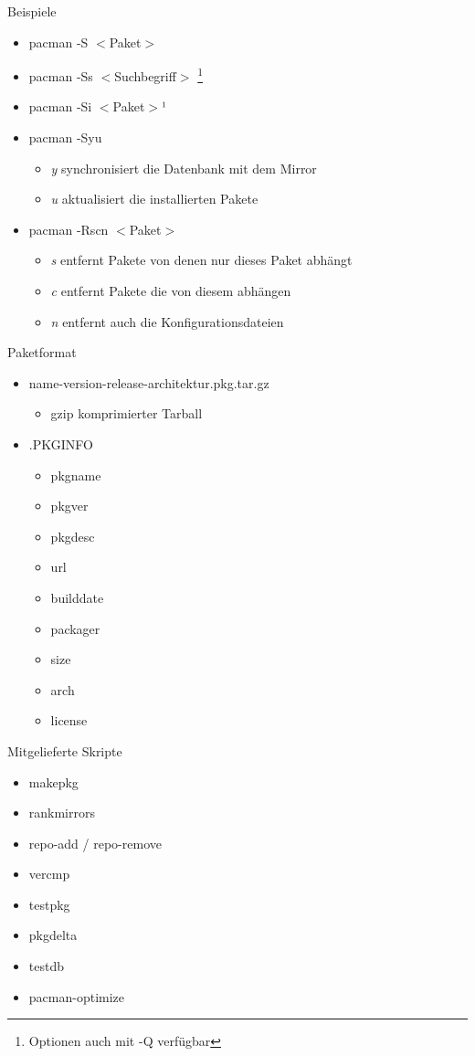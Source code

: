 \begin{slide}{Beispiele}
	\begin{itemize}
		\item{pacman -S $<$Paket$>$}
		\item{pacman -Ss $<$Suchbegriff$>$
			\footnote{Optionen auch mit -Q verf\"{u}gbar}
		}
		\item{pacman -Si $<$Paket$>$¹}
		\item{pacman -Syu
			\begin{itemize}
				\item{\textit{y} synchronisiert die Datenbank mit dem Mirror}
				\item{\textit{u} aktualisiert die installierten Pakete}
			\end{itemize}
		}
		\item{pacman -Rscn $<$Paket$>$
			\begin{itemize}
				\item{\textit{s} entfernt Pakete von denen nur dieses Paket
					abh\"{a}ngt}
				\item{\textit{c} entfernt Pakete die von diesem abh\"{a}ngen}
				\item{\textit{n} entfernt auch die Konfigurationsdateien}
			\end{itemize}
		}
	\end{itemize}
\end{slide}

\begin{slide}{Paketformat}
	\begin{itemize}
		\item{name-version-release-architektur.pkg.tar.gz
			\begin{itemize}
				\item{gzip komprimierter Tarball}
			\end{itemize}
		}
		\item{.PKGINFO
			\begin{itemize}
				\item{pkgname}
				\item{pkgver}
				\item{pkgdesc}
				\item{url}
				\item{builddate}
				\item{packager}
				\item{size}
				\item{arch}
				\item{license}
			\end{itemize}
		}		
	\end{itemize}
\end{slide}

\begin{slide}{Mitgelieferte Skripte}
		\begin{itemize}
			\item{makepkg}
			\item{rankmirrors}
			\item{repo-add / repo-remove}
			\item{vercmp}
			\item{testpkg}
			\item{pkgdelta}
			\item{testdb}
			\item{pacman-optimize}
		\end{itemize}
\end{slide}


